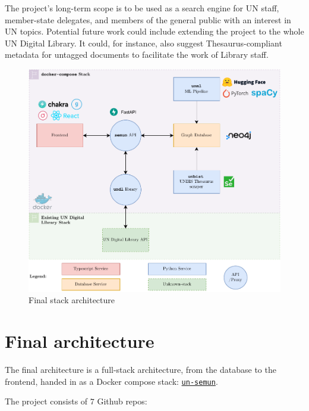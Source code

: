 \documentclass[11pt]{article}
\begin{document}
The project's long-term scope is to be used as a search engine for UN staff, member-state delegates, and members of the general public with an interest in UN topics. Potential future work could include extending the project to the whole UN Digital Library. It could, for instance, also suggest Thesaurus-compliant metadata for untagged documents to facilitate the work of Library staff.


\begin{figure}[!htb]
    \centering
    \includegraphics[width=\textwidth]{res/architecture-final.pdf}
    \caption{Final stack architecture}

    \label{fig:architecture}
\end{figure}

\section{Final architecture} \label{sec:final-architecture}

The final architecture is a full-stack architecture, from the database to the frontend, handed in as a Docker compose stack: \href{https://github.com/ClementSicard/un-semun}{\faGithub{} \texttt{un-semun}}.

The project consists of $7$ \faGithub{} Github repos:
\end{document}
